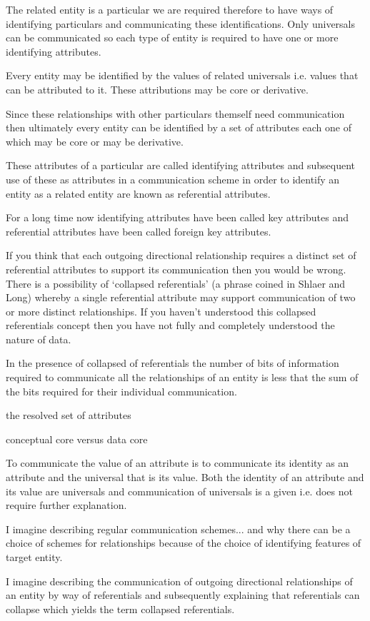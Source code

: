 \mynote The related entity is a particular we are required therefore to have ways of identifying particulars and communicating these identifications.  
Only universals can be communicated so each type of entity is required 
to have one or more identifying attributes. 

\mynote Every entity may be identified by the values of related universals i.e. values that can be attributed to it. These attributions  may be core or derivative.

\mynote Since these relationships with other particulars themself need communication then ultimately every entity can be identified by a set of attributes each one of which may be core or may be derivative.  

\mynote
These attributes of a particular are called identifying attributes and subsequent use of these as attributes in a communication scheme in order to identify an entity as a related entity are known as referential attributes. 

\mynote For a long time now identifying attributes have been called key attributes and referential attributes have been called foreign key attributes. 

\mynote If you think that each outgoing directional relationship requires a distinct set of referential attributes to support its communication then you would be wrong. 
There is a possibility of `collapsed referentials' (a phrase coined in Shlaer and Long) whereby a single referential attribute may support communication of two or more distinct relationships. If you haven't understood this collapsed referentials concept then you have not  fully and completely understood the nature of data. 

\mynote In the presence of collapsed of referentials the number of bits of information required to communicate all the relationships of an entity is less that the sum of the bits required for their individual communication. 

\mynote the resolved set of attributes

\mynote conceptual core versus data core

\begin{oldtt}
\mynote To communicate the value of an attribute is to communicate its identity as an attribute and the universal that is its value. Both the identity of an attribute and its value are universals and communication of universals is a given i.e. does not require further explanation. 
\end{oldtt}

\begin{noteforfuture}
I imagine describing regular communication schemes... and why there can be a choice of schemes for relationships because of the choice of identifying features of target entity. 
\end{noteforfuture}
\begin{noteforfuture}
I imagine describing the communication of outgoing directional relationships of an entity by way of referentials and subsequently explaining that referentials can collapse which yields the term collapsed referentials.
\end{noteforfuture}
